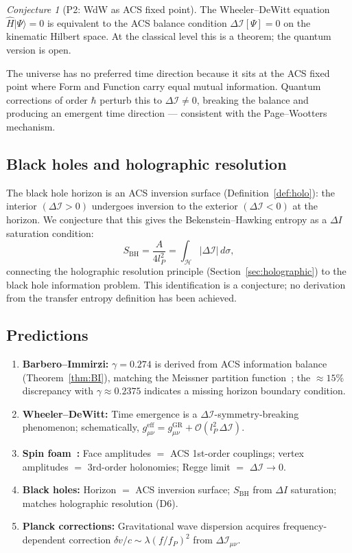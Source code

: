 \documentclass[12pt,a4paper]{article}
\theoremstyle{plain}
\theoremstyle{definition}
\theoremstyle{remark}
\newtheorem{conjecture}[theorem]{Conjecture}
\newcommand{\DI}{\Delta\mathcal{I}}
\newcommand{\Order}[1]{\mathcal{O}(#1)}
\begin{document}
\begin{conjecture}[P2: WdW as ACS fixed point]\label{conj:WdW}
The Wheeler--DeWitt equation $\hat{H}|\Psi\rangle = 0$ is equivalent to
the ACS balance condition $\DI[\Psi] = 0$ on the kinematic Hilbert space.
At the classical level this is a theorem; the quantum version is open.
\end{conjecture}

The universe has no preferred time direction because it sits at the ACS fixed
point where Form and Function carry equal mutual information.  Quantum corrections
of order $\hbar$ perturb this to $\DI \neq 0$, breaking the balance and producing
an emergent time direction --- consistent with the Page--Wootters mechanism.

\subsection{Black holes and holographic resolution}

The black hole horizon is an ACS inversion surface (Definition~\ref{def:holo}):
the interior $(\DI > 0)$ undergoes inversion to the exterior $(\DI < 0)$ at the horizon.
We conjecture that this gives the Bekenstein--Hawking entropy as a $\Delta I$ saturation condition:
\[
  S_{\text{BH}} = \frac{A}{4l_P^2} = \int_\mathcal{H} |\DI| \,d\sigma,
\]
connecting the holographic resolution principle (Section~\ref{sec:holographic})
to the black hole information problem.  This identification is a conjecture;
no derivation from the transfer entropy definition has been achieved.

\subsection{Predictions}

\begin{enumerate}[label=(P\arabic*)]
  \item \textbf{Barbero--Immirzi:} $\gamma = 0.274$ is derived from
    ACS information balance (Theorem~\ref{thm:BI}), matching the
    Meissner partition function~\cite{Meissner2004};
    the $\approx 15\%$ discrepancy with $\gamma \approx 0.2375$
    indicates a missing horizon boundary condition.
  \item \textbf{Wheeler--DeWitt:} Time emergence is a $\DI$-symmetry-breaking
    phenomenon; schematically, $g^{\mathrm{eff}}_{\mu\nu} = g^{\mathrm{GR}}_{\mu\nu} + \Order{l_P^2\,\DI}$.
  \item \textbf{Spin foam~\cite{EPRL2008}:} Face amplitudes $=$ ACS 1st-order couplings;
    vertex amplitudes $=$ 3rd-order holonomies; Regge limit $=$ $\DI \to 0$.
  \item \textbf{Black holes:} Horizon $=$ ACS inversion surface; $S_{\text{BH}}$
    from $\Delta I$ saturation; matches holographic resolution (D6).
  \item \textbf{Planck corrections:} Gravitational wave dispersion acquires
    frequency-dependent correction $\delta v/c \sim \lambda (f/f_P)^2$ from $\DI_{\mu\nu}$.
\end{enumerate}
\end{document}
